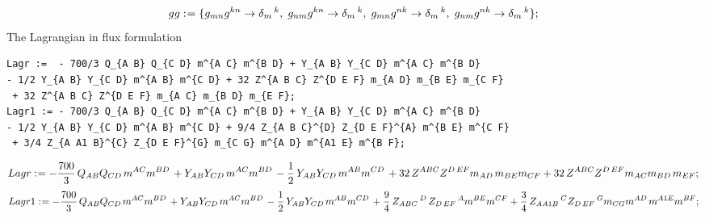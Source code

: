 \documentclass[11pt]{article}
\def\specialcolon{\mathrel{\mathop{:}}\hspace{-.5em}}
\begin{document}
\begin{dmath*}[compact, spread=2pt]
gg\specialcolon{}= \{{g}_{m n} {g}^{k n} \rightarrow {\delta}_{m}\,^{k},\; {g}_{n m} {g}^{k n} \rightarrow {\delta}_{m}\,^{k},\; {g}_{m n} {g}^{n k} \rightarrow {\delta}_{m}\,^{k},\; {g}_{n m} {g}^{n k} \rightarrow {\delta}_{m}\,^{k}\};
\end{dmath*}
The Lagrangian in flux formulation
{\color[named]{Blue}\begin{verbatim}
Lagr :=  - 700/3 Q_{A B} Q_{C D} m^{A C} m^{B D} + Y_{A B} Y_{C D} m^{A C} m^{B D} 
- 1/2 Y_{A B} Y_{C D} m^{A B} m^{C D} + 32 Z^{A B C} Z^{D E F} m_{A D} m_{B E} m_{C F}
 + 32 Z^{A B C} Z^{D E F} m_{A C} m_{B D} m_{E F};
Lagr1 := - 700/3 Q_{A B} Q_{C D} m^{A C} m^{B D} + Y_{A B} Y_{C D} m^{A C} m^{B D} 
- 1/2 Y_{A B} Y_{C D} m^{A B} m^{C D} + 9/4 Z_{A B C}^{D} Z_{D E F}^{A} m^{B E} m^{C F}
 + 3/4 Z_{A A1 B}^{C} Z_{D E F}^{G} m_{C G} m^{A D} m^{A1 E} m^{B F};
\end{verbatim}}
\begin{dmath*}[compact, spread=2pt]
Lagr\specialcolon{}=  - \frac{700}{3}\, {Q}_{A B} {Q}_{C D\, } {m}^{A C} {m}^{B D\, } + {Y}_{A B} {Y}_{C D\, } {m}^{A C} {m}^{B D\, } - \frac{1}{2}\, {Y}_{A B} {Y}_{C D\, } {m}^{A B} {m}^{C D\, } + 32\, {Z}^{A B C} {Z}^{D\,  E F} {m}_{A D\, } {m}_{B E} {m}_{C F} + 32\, {Z}^{A B C} {Z}^{D\,  E F} {m}_{A C} {m}_{B D\, } {m}_{E F};
\end{dmath*}
\begin{dmath*}[compact, spread=2pt]
Lagr1\specialcolon{}=  - \frac{700}{3}\, {Q}_{A B} {Q}_{C D\, } {m}^{A C} {m}^{B D\, } + {Y}_{A B} {Y}_{C D\, } {m}^{A C} {m}^{B D\, } - \frac{1}{2}\, {Y}_{A B} {Y}_{C D\, } {m}^{A B} {m}^{C D\, } + \frac{9}{4}\, {Z}_{A B C}\,^{D\, } {Z}_{D\,  E F}\,^{A} {m}^{B E} {m}^{C F} + \frac{3}{4}\, {Z}_{A A1 B}\,^{C} {Z}_{D\,  E F}\,^{G} {m}_{C G} {m}^{A D\, } {m}^{A1 E} {m}^{B F};
\end{dmath*}
\end{document}
